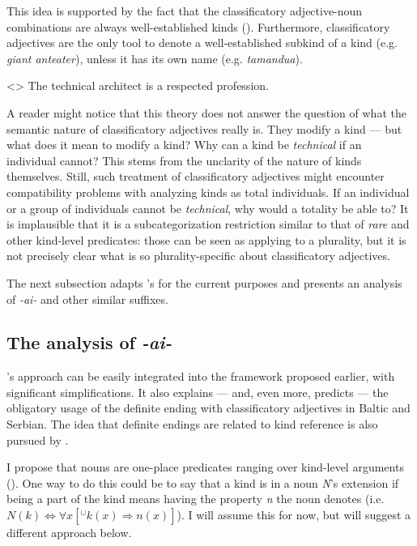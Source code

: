 \documentclass[a4paper, 12pt]{article}
\begin{document}
This idea is supported by the fact that the classificatory adjective-noun combinations are always well-established kinds (\nextx). Furthermore, classificatory adjectives are the only tool to denote a well-established subkind of a kind (e.g. \textit{giant anteater}), unless it has its own name (e.g. \textit{tamandua}).

\ex<>
    The technical architect is a respected profession.
\xe

A reader might notice that this theory does not answer the question of what the semantic nature of classificatory adjectives really is. They modify a kind --- but what does it mean to modify a kind? Why can a kind be \textit{technical} if an individual cannot? This stems from the unclarity of the nature of kinds themselves. Still, such treatment of classificatory adjectives might encounter compatibility problems with analyzing kinds as total individuals. If an individual or a group of individuals cannot be \textit{technical}, why would a totality be able to? It is implausible that it is a subcategorization restriction similar to that of \textit{rare} and other kind-level predicates: those can be seen as applying to a plurality, but it is not precisely clear what is so plurality-specific about classificatory adjectives.

The next subsection adapts \textcite{mcnally2004relationaladjectivesproperties}'s for the current purposes and presents an analysis of \textit{-ai-} and other similar suffixes.

\subsection{The analysis of \textit{-ai-}}

's approach can be easily integrated into the framework proposed earlier, with significant simplifications. It also explains --- and, even more, predicts --- the obligatory usage of the definite ending with classificatory adjectives in Baltic and Serbian. The idea that definite endings are related to kind reference is also pursued by \textcite{sereikaite2017kindreferencedps}.

I propose that nouns are one-place predicates ranging over kind-level arguments (). One way to do this could be to say that a kind is in a noun \textit{N}'s extension if being a part of the kind means having the property \textit{n} the noun denotes (i.e. $N(k)\iff \forall x[^\cup k(x)\Rightarrow n(x)]$). I will assume this for now, but will suggest a different approach below.
\end{document}

